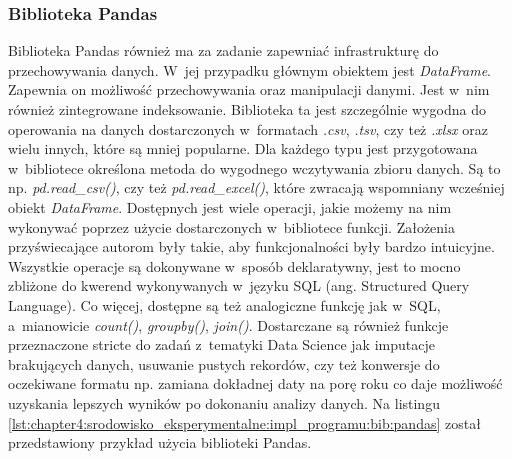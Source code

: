 \documentclass[../Kamil_Kowalewski_Main.tex]{subfiles}
\begin{document}
{{{            \subsubsection{Biblioteka Pandas}
            \label{chapter4:srodowisko_eksperymentalne:impl_programu:bib:pandas} {
                Biblioteka Pandas również ma za zadanie zapewniać infrastrukturę do
                przechowywania danych. W~jej przypadku głównym obiektem jest
                \textit{DataFrame}. Zapewnia on możliwość przechowywania oraz
                manipulacji danymi. Jest w~nim również zintegrowane indeksowanie.
                Biblioteka ta jest szczególnie wygodna do operowania na danych
                dostarczonych w~formatach \textit{.csv}, \textit{.tsv}, czy też
                \textit{.xlsx} oraz wielu innych, które są mniej popularne. Dla każdego
                typu jest przygotowana w~bibliotece określona metoda do wygodnego
                wczytywania zbioru danych. Są to np. \textit{pd.read\_csv()}, czy też
                \textit{pd.read\_excel()}, które zwracają wspomniany wcześniej obiekt
                \textit{DataFrame}. Dostępnych jest wiele operacji, jakie możemy na nim
                wykonywać poprzez użycie dostarczonych w~bibliotece funkcji. Założenia
                przyświecające autorom były takie, aby funkcjonalności były bardzo
                intuicyjne. Wszystkie operacje są dokonywane w~sposób deklaratywny,
                jest to mocno zbliżone do kwerend wykonywanych w~języku SQL
                (ang. Structured Query Language). Co więcej, dostępne są też analogiczne
                funkcję jak w~SQL, a~mianowicie \textit{count()}, \textit{groupby()},
                \textit{join()}. Dostarczane są również funkcje przeznaczone stricte do
                zadań z~tematyki Data Science jak imputacje brakujących danych,
                usuwanie pustych rekordów, czy też konwersje do oczekiwane formatu np.
                zamiana dokładnej daty na porę roku co daje możliwość uzyskania
                lepszych wyników po dokonaniu analizy danych. Na listingu
                \ref{lst:chapter4:srodowisko_eksperymentalne:impl_programu:bib:pandas}
                został przedstawiony przykład użycia biblioteki Pandas.

            }

}}}
\end{document}
